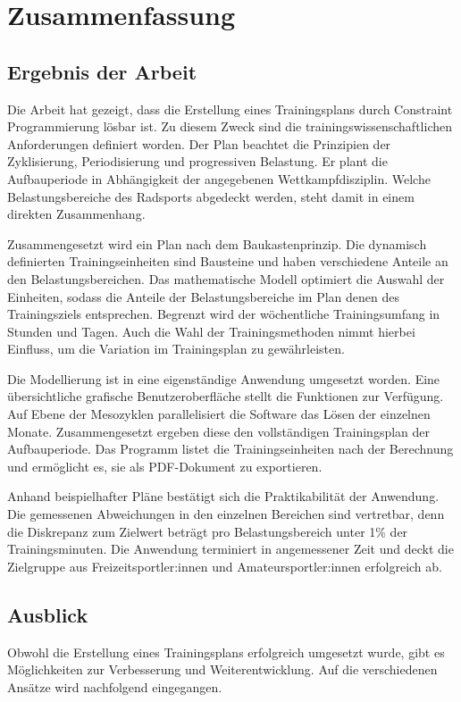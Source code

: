 \chapter{Zusammenfassung}
\label{sec:zusammenfassung}
\section{Ergebnis der Arbeit}
\label{sec:zusammenfassung:ergebnis}
Die Arbeit hat gezeigt, dass die Erstellung eines Trainingsplans durch Constraint Programmierung lösbar ist. Zu diesem Zweck sind die trainingswissenschaftlichen Anforderungen definiert worden. Der Plan beachtet die Prinzipien der Zyklisierung, Periodisierung und progressiven Belastung. Er plant die Aufbauperiode in Abhängigkeit der angegebenen Wettkampfdisziplin. Welche Belastungsbereiche des Radsports abgedeckt werden, steht damit in einem direkten Zusammenhang. \par 
Zusammengesetzt wird ein Plan nach dem Baukastenprinzip. Die dynamisch definierten Trainingseinheiten sind Bausteine und haben verschiedene Anteile an den Belastungsbereichen. Das mathematische Modell optimiert die Auswahl der Einheiten, sodass die Anteile der Belastungsbereiche im Plan denen des Trainingsziels entsprechen. Begrenzt wird der wöchentliche Trainingsumfang in Stunden und Tagen. Auch die Wahl der Trainingsmethoden nimmt hierbei Einfluss, um die Variation im Trainingsplan zu gewährleisten.\par
Die Modellierung ist in eine eigenständige Anwendung umgesetzt worden. Eine übersichtliche grafische Benutzeroberfläche stellt die Funktionen zur Verfügung. Auf Ebene der Mesozyklen parallelisiert die Software das Lösen der einzelnen Monate. Zusammengesetzt ergeben diese den vollständigen Trainingsplan der Aufbauperiode. Das Programm listet die Trainingseinheiten nach der Berechnung und ermöglicht es, sie als PDF-Dokument zu exportieren. \par
Anhand beispielhafter Pläne bestätigt sich die Praktikabilität der Anwendung. Die gemessenen Abweichungen in den einzelnen Bereichen sind vertretbar, denn die Diskrepanz zum Zielwert beträgt pro Belastungsbereich unter 1\% der Trainingsminuten. Die Anwendung terminiert in angemessener Zeit und deckt die Zielgruppe aus Freizeitsportler:innen und Amateursportler:innen erfolgreich ab.

\section{Ausblick}
\label{sec:zusammenfassung:ausblick}
Obwohl die Erstellung eines Trainingsplans erfolgreich umgesetzt wurde, gibt es Möglichkeiten zur Verbesserung und Weiterentwicklung. Auf die verschiedenen Ansätze wird nachfolgend eingegangen.

